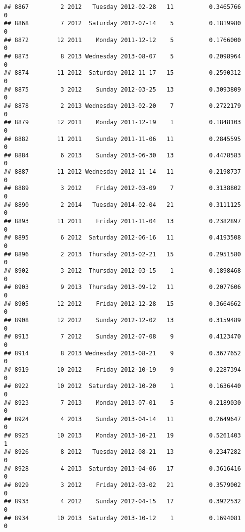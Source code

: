 \documentclass[
]{article}
\begin{document}
\begin{verbatim}
## 8867         2 2012   Tuesday 2012-02-28   11          0.3465766             0
## 8868         7 2012  Saturday 2012-07-14    5          0.1819980             0
## 8872        12 2011    Monday 2011-12-12    5          0.1766000             0
## 8873         8 2013 Wednesday 2013-08-07    5          0.2098964             0
## 8874        11 2012  Saturday 2012-11-17   15          0.2590312             0
## 8875         3 2012    Sunday 2012-03-25   13          0.3093809             0
## 8878         2 2013 Wednesday 2013-02-20    7          0.2722179             0
## 8879        12 2011    Monday 2011-12-19    1          0.1848103             0
## 8882        11 2011    Sunday 2011-11-06   11          0.2845595             0
## 8884         6 2013    Sunday 2013-06-30   13          0.4478583             0
## 8887        11 2012 Wednesday 2012-11-14   11          0.2198737             0
## 8889         3 2012    Friday 2012-03-09    7          0.3138802             0
## 8890         2 2014   Tuesday 2014-02-04   21          0.3111125             0
## 8893        11 2011    Friday 2011-11-04   13          0.2382897             0
## 8895         6 2012  Saturday 2012-06-16   11          0.4193508             0
## 8896         2 2013  Thursday 2013-02-21   15          0.2951580             0
## 8902         3 2012  Thursday 2012-03-15    1          0.1898468             0
## 8903         9 2013  Thursday 2013-09-12   11          0.2077606             0
## 8905        12 2012    Friday 2012-12-28   15          0.3664662             0
## 8908        12 2012    Sunday 2012-12-02   13          0.3159489             0
## 8913         7 2012    Sunday 2012-07-08    9          0.4123470             0
## 8914         8 2013 Wednesday 2013-08-21    9          0.3677652             0
## 8919        10 2012    Friday 2012-10-19    9          0.2287394             0
## 8922        10 2012  Saturday 2012-10-20    1          0.1636440             0
## 8923         7 2013    Monday 2013-07-01    5          0.2189030             0
## 8924         4 2013    Sunday 2013-04-14   11          0.2649647             0
## 8925        10 2013    Monday 2013-10-21   19          0.5261403             1
## 8926         8 2012   Tuesday 2012-08-21   13          0.2347282             0
## 8928         4 2013  Saturday 2013-04-06   17          0.3616416             0
## 8929         3 2012    Friday 2012-03-02   21          0.3579002             0
## 8933         4 2012    Sunday 2012-04-15   17          0.3922532             0
## 8934        10 2013  Saturday 2013-10-12    1          0.1694081             0

\end{verbatim}
\end{document}
